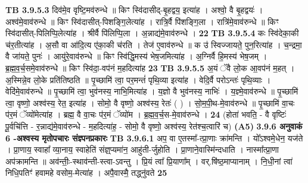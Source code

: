 \documentclass[17pt]{extarticle}
\begin{document}
{{{{{{{{{{{{{{{{{{{{{{                  \newline
                                \textbf{ TB 3.9.5.3} \newline
                  दिव॑मे॒व वृष्टि॒मव॑रुन्धे ॥ किꣳ स्वि॑दासीद्-बृ॒हद्वय॒ इत्या॑ह । अश्वो॒ वै बृ॒हद्वयः॑ । अश्व॑मे॒वाव॑रुन्धे ॥ किꣳ स्वि॑दासीत्-पिशङ्गि॒लेत्या॑ह । रात्रि॒र्वै पि॑शङ्गि॒ला । रात्रि॑मे॒वाव॑रुन्धे ॥ किꣳ स्वि॑दासीत्-पिलिप्पि॒लेत्या॑ह । श्रीर्वै पि॑लिप्पि॒ला । अ॒न्नाद्य॑मे॒वाव॑रुन्धे । \textbf{ 22} \newline
                  \newline
                                \textbf{ TB 3.9.5.4} \newline
                  कः स्वि॑देका॒की च॑र॒तीत्या॑ह । अ॒सौ वा आ॑दि॒त्य ए॑का॒की च॑रति । तेज॑ ए॒वाव॑रुन्धे ॥ क उ॑ स्विज्जायते॒ पुन॒रित्या॑ह । च॒न्द्रमा॒ वै जा॑यते॒ पुनः॑ । आयु॑रे॒वाव॑रुन्धे ॥ किꣳ स्वि॑द्धि॒मस्य॑ भेष॒जमित्या॑ह । अ॒ग्निर्वै हि॒मस्य॑ भेष॒जम् । ब्र॒ह्म॒व॒र्च॒समे॒वाव॑रुन्धे ॥ किꣳ स्वि॑दा॒-वप॑नं म॒हदित्या॑ह \textbf{ 23} \newline
                  \newline
                                \textbf{ TB 3.9.5.5} \newline
                  अ॒यं ॅवै लो॒क आ॒वप॑नं म॒हत् । अ॒स्मिन्ने॒व लो॒के प्रति॑तिष्ठति ॥ पृ॒च्छामि॑ त्वा॒ पर॒मन्तं॑ पृथि॒व्या इत्या॑ह । वेदि॒र्वै परोऽन्तः॑ पृथि॒व्याः । वेदि॑मे॒वाव॑रुन्धे ॥ पृ॒च्छामि॑ त्वा॒ भुव॑नस्य॒ नाभि॒मित्या॑ह । य॒ज्ञो वै भुव॑नस्य॒ नाभिः॑ । य॒ज्ञ्मे॒वाव॑रुन्धे ॥ पृ॒च्छामि॑ त्वा॒ वृष्णो॒ अश्व॑स्य॒ रेत॒ इत्या॑ह । सोमो॒ वै वृष्णो॒ अश्व॑स्य॒ रेतः॑ ( ) । सो॒म॒पी॒थ-मे॒वाव॑रुन्धे ॥ पृ॒च्छामि॑ वा॒चः प॑र॒मं ॅव्यो॑मेत्या॑ह । ब्रह्म॒ वै वा॒चः प॑र॒मं ॅव्यो॑म । ब्र॒ह्म॒व॒र्च॒स-मे॒वाव॑रुन्धे । \textbf{ 24} \newline
                  \newline
                                    (होता॑ भवति॒ - वै वृष्टिः॑ पू॒र्वचि॑त्ति - र॒न्नाद्य॑मे॒वाव॑रुन्धे - म॒हदित्या॑ह॒ - सोमो॒ वै वृष्णो॒ अश्व॑स्य॒ रेत॑श्च॒त्वारि॑ च) \textbf{(A5)} \newline \newline
                \textbf{ 3.9.6     अनुवाकं   6 -अश्वस्य मृतोपचारः संज्ञ्पनप्रकारः} \newline
                                \textbf{ TB 3.9.6.1} \newline
                  अप॒ वा ए॒तस्मा᳚-त्प्रा॒णाः क्रा॑मन्ति । यो᳚ऽश्वमे॒धेन॒ यज॑ते । प्रा॒णाय॒ स्वाहा᳚ व्या॒नाय॒ स्वाहेति॑ संज्ञ्॒प्यमा॑न॒ आहु॑ती-र्जुहोति । प्रा॒णाने॒वास्मि॑न्दधाति । नास्मा᳚त्प्रा॒णा अप॑क्रामन्ति ॥ अव॑न्तीः॒-स्थाव॑न्ती-स्त्वा-ऽवन्तु । प्रि॒यं त्वा᳚ प्रि॒याणा᳚म् । वर्.षि॑ष्ठ॒माप्यानाम् । नि॒धी॒नां त्वा॑ निधि॒पतिꣳ॑ हवामहे वसोम॒-मेत्या॑ह । अपै॒वास्मै॒ तद्ध्नु॑वते \textbf{ 25} \newline
}}}}}}}}}}}}}}}}}}}}}}
\end{document}
